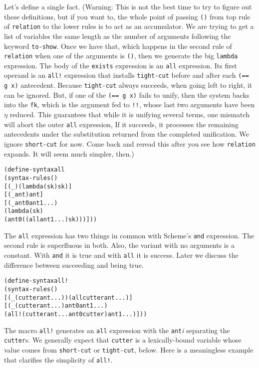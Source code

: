 Let's define a single fact. (Warning: This is not the best time to try
to figure out these definitions, but if you want to, the whole point
of passing \texttt{()} from top rule of \texttt{relation} to the lower
rules is to act as an accumulator.  We are trying to get a list of
variables the same length as the number of arguments following the
keyword \texttt{to-show}. Once we have that, which happens in the
second rule of \texttt{relation} when one of the arguments is
\texttt{()}, then we generate the big \texttt{lambda} expression.  The
body of the \texttt{exists} expression is an \texttt{all} expression.
Its first operand is an \texttt{all!} expression that installs
\texttt{tight-cut} before and after each \texttt{(== g x)} antecedent.
Because \texttt{tight-cut} always succeeds, when going left to right,
it can be ignored.  But, if one of the \texttt{(== g x)} fails to
unify, then the system backs into the \texttt{fk}, which is the
argument fed to \texttt{!!}, whose last two arguments have been $\eta$
reduced. This guarantees that while it is unifying several terms, one
mismatch will abort the outer \texttt{all} expression, If it succeeds,
it processes the remaining antecedents under the substitution returned
from the completed unification.  We ignore \texttt{short-cut} for
now. Come back and reread this after you see how \texttt{relation}
expands.  It will seem much simpler, then.)

\begin{alltt}
(define-syntax all
  (syntax-rules ()
    [(_) (lambda (sk) sk)]
    [(_ ant) ant]
    [(_ ant0 ant1 ...)
     (lambda (sk)
       (ant0 ((all ant1 ...) sk)))]))
\end{alltt}

The \texttt{all} expression has two things in common with Scheme's
\texttt{and} expression.  The second rule is superfluous in both.
Also, the variant with no arguments is a constant.  With \texttt{and}
it is true and with \texttt{all} it is success.  Later we discuss the
difference between succeeding and being true.

\begin{alltt}
(define-syntax all!
  (syntax-rules ()
    [(_ (cutter ant ...)) (all cutter ant ...)]
    [(_ (cutter ant ...) ant0 ant1 ...)
     (all! (cutter ant ... ant0 cutter) ant1 ...)]))
\end{alltt}

The macro \texttt{all!} generates an \texttt{all} expression with the
\texttt{ant}\emph{i} separating the \texttt{cutter}s.  We generally
expect that \texttt{cutter} is a lexically-bound variable whose value comes
from \texttt{short-cut} or \texttt{tight-cut}, below.  Here is a meaningless
example that clarifies the simplicity of \texttt{all!}.

